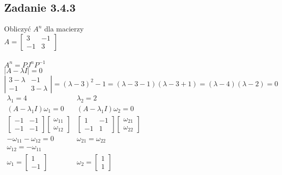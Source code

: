 \pagebreak
\subsection*{Zadanie 3.4.3} {\color{darkgray}
	Obliczyć $A^n$ dla macierzy\\
	$A=\left[ \begin{array}{cc} 3&-1\\-1&3\end{array}\right]$
}\\\\
$A^n=PJ^nP^{-1}$\\
$|A- \lambda I|=0$\\
$\left|\begin{array}{cc} 3-\lambda&-1\\-1&3-\lambda\end{array}\right|=(\lambda-3)^2-1=(\lambda-3-1)(\lambda-3+1)=(\lambda-4)(\lambda-2)=0$\\
$\begin{array}{cc}
\lambda_1=4 &\lambda_2=2\\
	(A-\lambda_1I)\omega_1=0		& (A-\lambda_1I)\omega_2=0 \\
	     \left[ \begin{array}{cc} -1&-1\\-1&-1\end{array}\right]  \left[ \begin{array}{c}\omega_{11}\\\omega_{12}\end{array}\right]
	&   \left[ \begin{array}{cc} 1&-1\\-1&1\end{array}\right]    \left[ \begin{array}{c}\omega_{21}\\\omega_{22}\end{array}\right]
	\\ -\omega_{11}-\omega_{12}=0	&\omega_{21}=\omega_{22}\\
	\omega_{12}=-\omega_{11}& \\
	\omega_1=\left[ \begin{array}{c}1\\-1\end{array}\right] 	&\omega_2=\left[ \begin{array}{c}1\\1\end{array}\right]
\end{array}$\\
